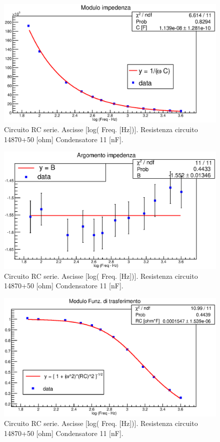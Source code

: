 \begin{figure}[H]
\centering
\includegraphics[scale=0.7]{Grafici/C3_P1_ModImp_cond1.eps}
\caption{
Circuito RC serie.
Ascisse [log( Freq. [Hz])].
Resistenza circuito 14870+50 [ohm]
Condensatore 11 [nF].
}
\label{fig:C3_P1_ModImp_cond1}
\end{figure}

\begin{figure}[H]
\centering
\includegraphics[scale=0.7]{Grafici/C3_P1_ArgImp_cond1.eps}
\caption{
Circuito RC serie.
Ascisse [log( Freq. [Hz])].
Resistenza circuito 14870+50 [ohm]
Condensatore 11 [nF].
}
\label{fig:C3_P1_ArgImp_cond1}
\end{figure}

\begin{figure}[H]
\centering
\includegraphics[scale=0.7]{Grafici/C3_P1_ModFdT_cond1.eps}
\caption{
Circuito RC serie.
Ascisse [log( Freq. [Hz])].
Resistenza circuito 14870+50 [ohm]
Condensatore 11 [nF].
}
\label{fig:C3_P1_ModFdT_cond1}
\end{figure}

